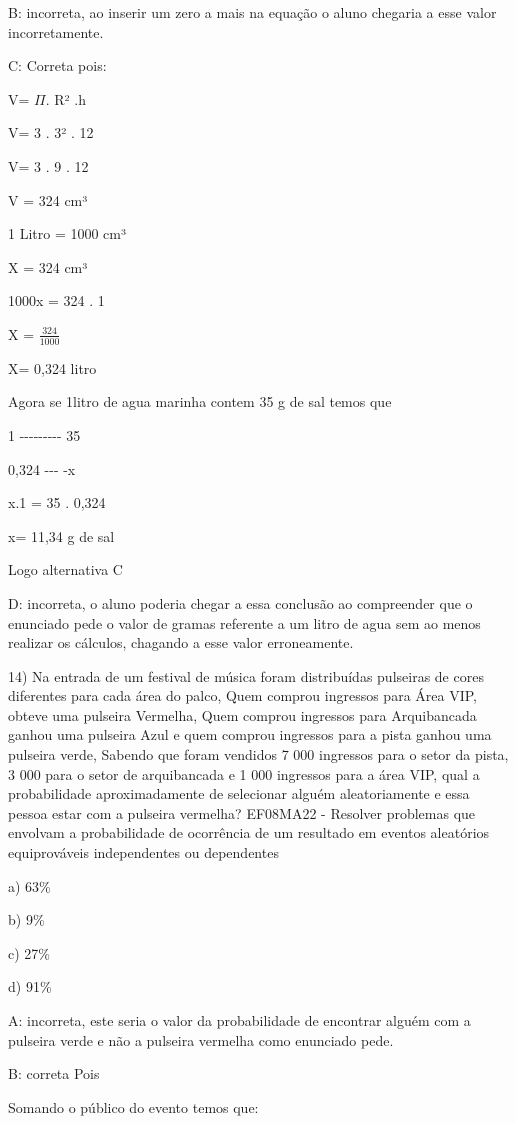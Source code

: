 {B: incorreta, ao inserir um zero a mais na equação o aluno chegaria a
esse valor incorretamente.

C: Correta pois:

V= \(\Pi\). R² .h

V= 3 . 3² . 12

V= 3 . 9 . 12

V = 324 cm³

1 Litro = 1000 cm³

X = 324 cm³

1000x = 324 . 1

X = \(\frac{324}{1000}\)

X= 0,324 litro

Agora se 1litro de agua marinha contem 35 g de sal temos que

1 -\/-\/-\/-\/-\/-\/-\/-\/- 35

0,324 -\/-\/- -x

x.1 = 35 . 0,324

x= 11,34 g de sal

Logo alternativa C

D: incorreta, o aluno poderia chegar a essa conclusão ao compreender que
o enunciado pede o valor de gramas referente a um litro de agua sem ao
menos realizar os cálculos, chagando a esse valor erroneamente.

14) Na entrada de um festival de música foram distribuídas pulseiras de
cores diferentes para cada área do palco, Quem comprou ingressos para
Área VIP, obteve uma pulseira Vermelha, Quem comprou ingressos para
Arquibancada ganhou uma pulseira Azul e quem comprou ingressos para a
pista ganhou uma pulseira verde, Sabendo que foram vendidos 7 000
ingressos para o setor da pista, 3 000 para o setor de arquibancada e 1
000 ingressos para a área VIP, qual a probabilidade aproximadamente de
selecionar alguém aleatoriamente e essa pessoa estar com a pulseira
vermelha? EF08MA22 - Resolver problemas que envolvam a probabilidade de
ocorrência de um resultado em eventos aleatórios equiprováveis
independentes ou dependentes

a) 63\%

b) 9\%

c) 27\%

d) 91\%

A: incorreta, este seria o valor da probabilidade de encontrar alguém
com a pulseira verde e não a pulseira vermelha como enunciado pede.

B: correta Pois

Somando o público do evento temos que:

}
